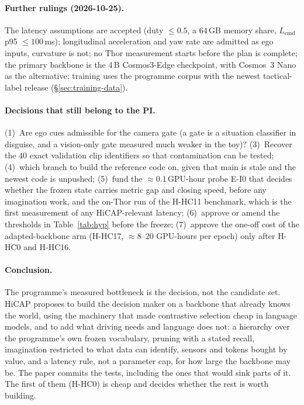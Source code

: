 \paragraph{Further rulings (2026-10-25).} The latency assumptions are accepted (duty $\le0.5$, a $64$\,GB memory share, $L_{\text{cmd}}$ p95 $\le100$\,ms); longitudinal acceleration and yaw rate are admitted as ego inputs, curvature is not; no Thor measurement starts before the plan is complete; the primary backbone is the 4\,B Cosmos3-Edge checkpoint, with Cosmos~3 Nano as the alternative; training uses the programme corpus with the newest tactical-label release (\S\ref{sec:training-data}).

\paragraph{Decisions that still belong to the PI.}
(1)~Are ego cues admissible for the camera gate (a gate is a situation classifier in disguise, and a vision-only gate measured much weaker in the toy)? (3)~Recover the $40$ exact validation clip identifiers so that contamination can be tested; (4)~which branch to build the reference code on, given that main is stale and the newest code is unpushed; (5)~fund the $\approx0.1$\,GPU-hour probe E-I0 that decides whether the frozen state carries metric gap and closing speed, before any imagination work, and the on-Thor run of the H-HC11 benchmark, which is the first measurement of any HiCAP-relevant latency; (6)~approve or amend the thresholds in Table~\ref{tab:hyp} before the freeze; (7)~approve the one-off cost of the adapted-backbone arm (H-HC17, $\approx8$--$20$ GPU-hours per epoch) only after H-HC0 and H-HC16.

\paragraph{Conclusion.}
The programme's measured bottleneck is the decision, not the candidate set. HiCAP proposes to build the decision maker on a backbone that already knows the world, using the machinery that made contrastive selection cheap in language models, and to add what driving needs and language does not: a hierarchy over the programme's own frozen vocabulary, pruning with a stated recall, imagination restricted to what data can identify, sensors and tokens bought by value, and a latency rule, not a parameter cap, for how large the backbone may be. The paper commits the tests, including the ones that would sink parts of it. The first of them (H-HC0) is cheap and decides whether the rest is worth building.
